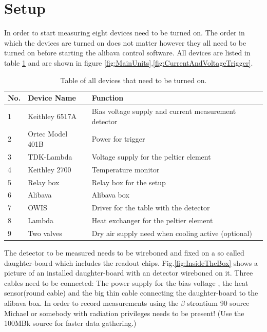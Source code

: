\documentclass{article}
\begin{document}
\section{Setup}
In order to start measuring eight devices need to be turned on. The order in which the devices are turned on does not matter however they all need to be turned on before starting the alibava control software.  All devices are listed in table \ref{tab:devices} and are shown in figure \ref{fig:MainUnits},\ref{fig:CurrentAndVoltageTrigger}.
\begin{table}[htb]
\begin{center}
    \begin{tabular}{|l|l|l|}
        \hline
	No. & Device Name		& Function	\\  \hline
        1 & Keithley 6517A		& Bias voltage supply and current measurement detector 		 \\
        2 & Ortec Model 401B		& Power for trigger		\\ 
        3 & TDK-Lambda			& Voltage supply for the peltier element		 \\ 
        4 & Keithley 2700		& Temperature monitor 		 \\ 
        5 & Relay box			& Relay box for the setup		 \\ 
        6 & Alibava			& Alibava box		 \\ 
        7 & OWIS			& Driver for the table with the detector		 \\ 
        8 & Lambda			& Heat exchanger for the peltier element		 \\ 
        9 & Two valves			& Dry air supply need when cooling active (optional) \\
        \hline

    \end{tabular}
\caption{Table of all devices that need to be turned on.}
\end{center}
\label{tab:devices}
\end{table}
The detector to be measured needs to be wireboned and fixed on a so called daughter-board which includes the readout chips. Fig.\ref{fig:InsideTheBox} shows a picture of an installed daughter-board with an detector wireboned on it. Three cables need to be connected: The power supply for the bias voltage , the heat sensor(round cable) and the big thin cable connecting the daughter-board to the alibava box.
In order to record measurements using the $\beta$ strontium 90 source Michael or somebody with radiation privileges needs to be present! (Use the 100MBk source for faster data gathering.)
\end{document}
